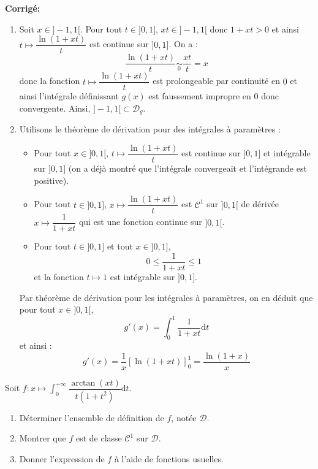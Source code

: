 \documentclass[a4paper,twoside,french,11pt]{VcCours}
\newcommand{\dt}{\text{d}t}
\newcommand{\corr}{\textbf{Corrigé:}}
\begin{document}
\corr 
\begin{enumerate}
\item Soit $x \in ]-1,1[$. Pour tout $t \in ]0,1]$, $xt \in ]-1,1[$ donc $1+xt >0$ et ainsi $t \mapsto \dfrac{\ln(1+xt)}{t} $ est continue sur $]0,1]$. On a :
$$ \dfrac{\ln(1+xt)}{t}  \underset{0}{\sim} \dfrac{xt}{t}= x$$
donc la fonction $t \mapsto \dfrac{\ln(1+xt)}{t} $ est prolongeable par continuité en $0$ et ainsi l'intégrale définissant $g(x)$ est faussement impropre en $0$ donc convergente. Ainsi, $]-1,1[ \subset \mathcal{D}_g$.

\item Utilisons le théorème de dérivation pour des intégrales à paramètres :
\begin{itemize}
\item Pour tout $x \in ]0,1[$, $t \mapsto \dfrac{\ln(1+xt)}{t}$ est continue sur $]0,1]$ et intégrable sur $]0,1]$ (on a déjà montré que l'intégrale convergeait et l'intégrande est positive).
\item Pour tout $t \in ]0,1]$, $x \mapsto \dfrac{\ln(1+xt)}{t}$ est $\mathcal{C}^1$ sur $]0,1[$ de dérivée $x \mapsto \dfrac{1}{1+xt}$ qui est une fonction continue sur $]0,1[$.
\item Pour tout $t \in ]0,1]$ et tout $x \in ]0,1]$,
$$ 0 \leq \dfrac{1}{1+xt} \leq 1$$
et la fonction $t \mapsto 1$ est intégrable sur $]0,1]$.
\end{itemize}
Par théorème de dérivation pour les intégrales à paramètres, on en déduit que pour tout $x \in ]0,1[$,
$$ g'(x) = \int_{0}^1 \dfrac{1}{1+xt} \dt$$
et ainsi :
$$ g'(x) = \dfrac{1}{x} [ \ln(1+xt) ]_0^1 = \dfrac{\ln(1+x)}{x}$$
\end{enumerate}

\begin{Exercice}{} Soit $f : x \mapsto \int_{0}^{+ \infty} \dfrac{\arctan(xt)}{t(1+t^2)} \dt$.
\begin{enumerate}
\item Déterminer l'ensemble de définition de $f$, notée $\mathcal{D}$.
\item Montrer que $f$ est de classe $\mathcal{C}^1$ sur $\mathcal{D}$.
\item Donner l'expression de $f$ à l'aide de fonctions usuelles.
\end{enumerate}
\end{Exercice}
\end{document}
